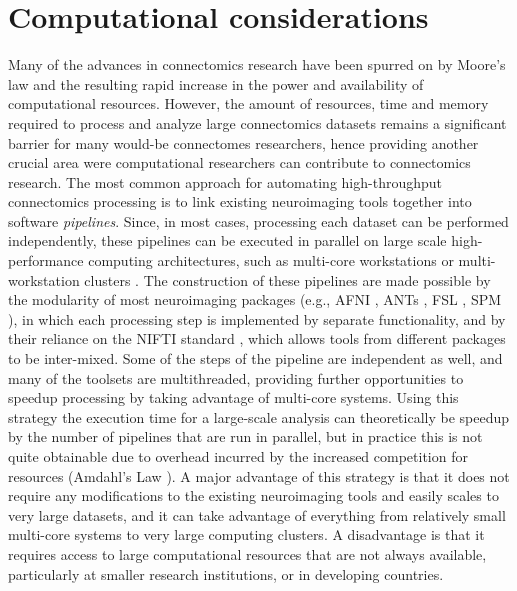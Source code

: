 \documentclass{bmcart}
\def\marker{%
    \vadjust{{%
	\llap{\smash{%
	    \color{purple}%
	    \scalebox{1.8}{$\filledmedtriangleright$}}\;}%
    }}\hspace*{-.1ex}%
}%
\begin{document}
\section{Computational considerations}

Many \marker{of} the advances in connectomics research have been spurred on by Moore's law and the resulting rapid increase in the power and availability of computational resources. However, the amount of resources, time and memory required to process and analyze large connectomics datasets remains a significant barrier for many would-be connectomes researchers, hence providing another crucial area were computational researchers can contribute to connectomics research. The most common approach for automating high-throughput connectomics processing is to link existing neuroimaging tools together into software \emph{pipelines}. Since, in most cases, processing each dataset can be performed independently, these pipelines can be executed in parallel on large scale high-performance computing architectures, such as multi-core workstations or multi-workstation clusters \cite{Dinov2010, Yan2010, Bellec2012, SLV2012, Gorgolewski2011, Craddock2013c}. The construction of these pipelines are made possible by the modularity of most neuroimaging packages (e.g., AFNI \cite{Cox1996}, ANTs \cite{Avants2008}, FSL \cite{Smith2004}, SPM \cite{Friston1994b}), in which each processing step is implemented by separate functionality, and by their reliance on the NIFTI standard \cite{Cox2004}, which allows tools from different packages to be inter-mixed. Some of the steps of the pipeline are independent as well, and many of the toolsets are multithreaded, providing further opportunities to speedup processing by taking advantage of multi-core systems. Using this strategy the execution time for a large-scale analysis can theoretically be speedup by the number of pipelines that are run in parallel, but in practice this is not quite obtainable due to overhead incurred by the increased competition for resources (Amdahl's Law \cite{Amdahl1967}). A major advantage of this strategy is that it does not require any modifications to the existing neuroimaging tools and easily scales to very large datasets, and it can take advantage of everything from relatively small multi-core systems to very large computing clusters. A disadvantage is that it requires access to large computational resources that are not always available, particularly at smaller research institutions, or in developing countries.
\end{document}

